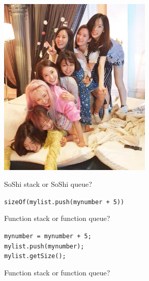 \documentclass[spanish, c]{beamer}
\begin{document}
\begin{frame}[plain]
    
    \begin{center}
        \includegraphics[width=0.55\textwidth]{soshi-pile.jpg}

        \bigskip

        {\huge SoShi stack or SoShi queue?}
    \end{center}

\end{frame}

\begin{frame}[plain]

    \begin{center}
        \texttt{sizeOf(mylist.push(mynumber + 5))}    

        \bigskip

    {\huge Function stack or function queue?}
    \end{center}

\end{frame}


\begin{frame}[plain]

    \begin{center}
        \texttt{mynumber = mynumber + 5;\\mylist.push(mynumber);\\mylist.getSize();}
        
        \bigskip

    {\huge Function stack or function queue?}
    \end{center}

\end{frame}





\end{document}
